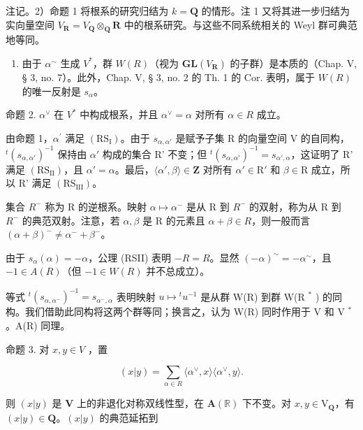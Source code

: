 注记。2）命题 1 将根系的研究归结为 \(k = \mathbf{Q}\) 的情形。注 1 又将其进一步归结为实向量空间 \(V_{\mathbf{R}} = V_{\mathbf{Q}} \otimes_{\mathbf{Q}} \mathbf{R}\) 中的根系研究。与这些不同系统相关的 Weyl 群可典范地等同。

\begin{enumerate}
\def\labelenumi{\arabic{enumi})}
\setcounter{enumi}{2}
\tightlist
\item
  由于 \(\alpha^{\sim}\) 生成 \(V^{*}\)，群 \(W(R)\)（视为 \(\mathbf{GL}(V_{\mathbf{R}})\) 的子群）是本质的（Chap. V, § 3, no. 7）。此外，Chap. V, § 3, no. 2 的 Th. 1 的 Cor. 表明，属于 \(W(R)\) 的唯一反射是 \(s_{\alpha}\)。
\end{enumerate}

命题 2. \(\alpha^{\vee}\) 在 \(V^{*}\) 中构成根系，并且 \(\alpha^{\vee} = \alpha\) 对所有 \(\alpha \in R\) 成立。

由命题 1，\(\alpha^{\prime}\) 满足 \((\mathrm{RS}_{\mathrm{I}})\)。由于 \(s_{\alpha, \alpha'}\) 是赋予子集 R 的向量空间 V 的自同构，\({}^{t}(s_{\alpha, \alpha'})^{-1}\) 保持由 \(\alpha'\) 构成的集合 R' 不变；但 \({}^{t}(s_{\alpha, \alpha'})^{-1} = s_{\alpha', \alpha}\)，这证明了 R' 满足 \((\mathrm{RS}_{\mathrm{II}})\)，且 \(\alpha' = \alpha\)。最后，\(\langle \alpha', \beta \rangle \in \mathbf{Z}\) 对所有 \(\alpha' \in \mathrm{R'}\) 和 \(\beta \in \mathrm{R}\) 成立，所以 R' 满足 \((\mathrm{RS}_{\mathrm{III}})\)。

集合 \(R^{-}\) 称为 R 的逆根系。映射 \(\alpha \mapsto \alpha^{-}\) 是从 R 到 \(R^{-}\) 的双射，称为从 R 到 \(R^{-}\) 的典范双射。注意，若 \(\alpha, \beta\) 是 R 的元素且 \(\alpha + \beta \in R\)，则一般而言 \((\alpha + \beta)^{-} \neq \alpha^{-} + \beta^{-}\)。

由于 \(s_{\alpha}(\alpha) = -\alpha\)，公理 (RSII) 表明 \(-R = R\)。显然 \((- \alpha)^{\sim} = -\alpha^{\sim}\)，且 \(-1 \in A(R)\)（但 \(-1 \in W(R)\) 并不总成立）。

等式 \({}^{t}(s_{\alpha,\alpha^{-}})^{-1}=s_{\alpha^{-},\alpha}\) 表明映射 \(u\mapsto{}^{t}u^{-1}\) 是从群 W(R) 到群 W(R \(^{*}\) ) 的同构。我们借助此同构将这两个群等同；换言之，认为 W(R) 同时作用于 V 和 V \(^{*}\)。A(R) 同理。

命题 3. 对 \(x, y \in V\) ，置

\[
(x | y) = \sum_ {\alpha \in R} \langle \alpha^ {\vee}, x \rangle \langle \alpha^ {\vee}, y \rangle .
\]

则 \((x|y)\) 是 \(\mathbf{V}\) 上的非退化对称双线性型，在 \(\mathbf{A}(\mathbb{R})\) 下不变。对 \(x, y \in \mathrm{V}_{\mathbf{Q}}\)，有 \((x|y) \in \mathbf{Q}\)。\((x|y)\) 的典范延拓到

